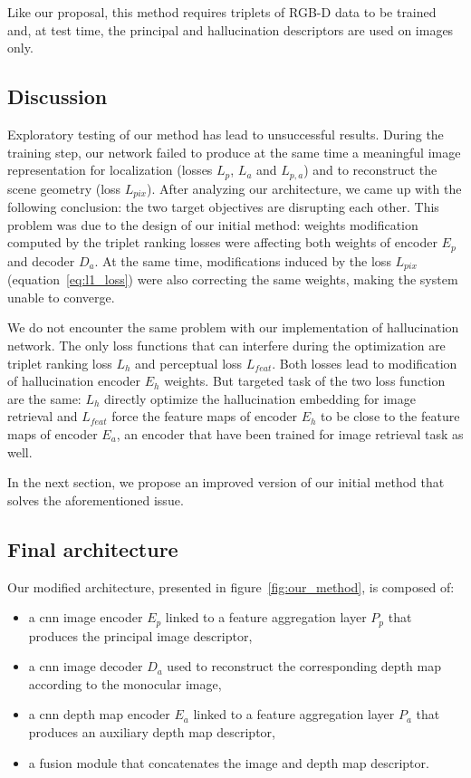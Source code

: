 Like our proposal, this method requires triplets of RGB-D data to be trained and, at test time, the principal and hallucination descriptors are used on images only.

\subsection{Discussion}
\label{subsec:discussion}
Exploratory testing of our method has lead to unsuccessful results. During the training step, our network failed to produce at the same time a meaningful image representation for localization (losses $L_p$, $L_a$ and $L_{p,a}$) and to reconstruct the scene geometry (loss $L_{pix}$). After analyzing our architecture, we came up with the following conclusion: the two target objectives are disrupting each other. This problem was due to the design of our initial method: weights modification computed by the triplet ranking losses were affecting both weights of encoder $E_p$ and decoder $D_a$. At the same time, modifications induced by the loss $L_{pix}$ (equation~\ref{eq:l1_loss}) were also correcting the same weights, making the system unable to converge. 

We do not encounter the same problem with our implementation of hallucination network. The only loss functions that can interfere during the optimization are triplet ranking loss $L_h$ and perceptual loss $L_{feat}$. Both losses lead to modification of hallucination encoder $E_h$ weights. But targeted task of the two loss function are the same: $L_h$ directly optimize the hallucination embedding for image retrieval and $L_{feat}$ force the feature maps of encoder $E_h$ to be close to the feature maps of encoder $E_a$, an encoder that have been trained for image retrieval task as well.

In the next section, we propose an improved version of our initial method that solves the aforementioned issue.

\subsection{Final architecture}

Our modified architecture, presented in figure~\ref{fig:our_method}, is composed of:

\begin{itemize}
	\item a \ac{cnn} image encoder $E_p$ linked to a feature aggregation layer $P_p$ that produces the principal image descriptor,
	\item a \ac{cnn} image decoder $D_a$ used to reconstruct the corresponding depth map according to the monocular image,
	\item a \ac{cnn} depth map encoder $E_a$ linked to a feature aggregation layer $P_a$ that produces an auxiliary depth map descriptor,
	\item a fusion module that concatenates the image and depth map descriptor.
\end{itemize}

